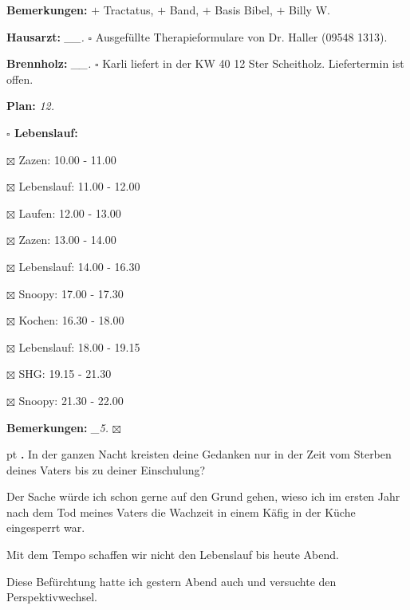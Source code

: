\documentclass[10pt,a4paper]{article}
\newcounter{notec}
\newcommand\notep[1]{%
  \stepcounter{notec}
  \vskip #1pt
  {\bf\arabic{notec}.}
}
\newcommand\prop[1] {{\color {alizarin} {\bf #1}}}             %
\newcommand\opti[1] {{\color {amethyst} {\bf #1}}}             %
\newcommand\mand[1] {{\color {burntorange} {\bf #1}}}          %
\newcommand\topspace{\vskip -15pt \hskip 20pt}
\newcommand\bottomspace{\vskip 4pt}
\newcommand\n[1] { {\sl #1.} \hskip 5pt }
\begin{document}
\begin{mdframed}[style=daystyle]
\begin{labeling}{{\mand {Bemerkungen:}}}
    $+$ Tractatus, $+$ Band, $+$ Basis Bibel, $+$ Billy W.
  \item[{\opti {Hausarzt:}}]     \n{\_\_} $\square$ Ausgefüllte Therapieformulare von
    Dr. Haller (09548 1313).
  \item[{\opti {Brennholz:}}]    \n{\_\_} $\square$ Karli liefert in der KW 40 12 Ster Scheitholz.
    Liefertermin ist offen.
  \item[{\mand {Plan:}}]           \n{12}
    \topspace
    \begin{minipage}{0.75\textwidth}  
      \begin{labeling}{\prop {$\square$ {Lebenslauf:}}} 
        \setlength\itemsep{-3pt}
      \item[$\boxtimes$ Zazen:]      10.00 - 11.00
      \item[$\boxtimes$ Lebenslauf:] 11.00 - 12.00        
      \item[$\boxtimes$ Laufen:]     12.00 - 13.00
      \item[$\boxtimes$ Zazen:]      13.00 - 14.00
      \item[$\boxtimes$ Lebenslauf:] 14.00 - 16.30
      \item[$\boxtimes$ Snoopy:]     17.00 - 17.30
      \item[$\boxtimes$ Kochen:]     16.30 - 18.00
      \item[$\boxtimes$ Lebenslauf:] 18.00 - 19.15
      \item[$\boxtimes$ SHG:]        19.15 - 21.30
      \item[$\boxtimes$ Snoopy:]     21.30 - 22.00
      \end{labeling}
    \end{minipage}
    \bottomspace
  \item[{\mand {Bemerkungen:}}]   \n{\_5} $\boxtimes$
  \end{labeling}
    
  \setcounter{notec}{0}
  
  \notep 0 In der ganzen Nacht kreisten deine Gedanken nur in der Zeit vom
  Sterben deines Vaters bis zu deiner Einschulung?

  \vskip 2pt
  Der Sache würde ich schon gerne auf den Grund gehen, wieso ich im ersten Jahr
  nach dem Tod meines Vaters die Wachzeit in einem Käfig in der Küche eingesperrt war.

  \vskip 2pt
  Mit dem Tempo schaffen wir nicht den Lebenslauf bis heute Abend.

  \vskip 2pt
  Diese Befürchtung hatte ich gestern Abend auch und versuchte den Perspektivwechsel.


\end{mdframed}
\end{document}
